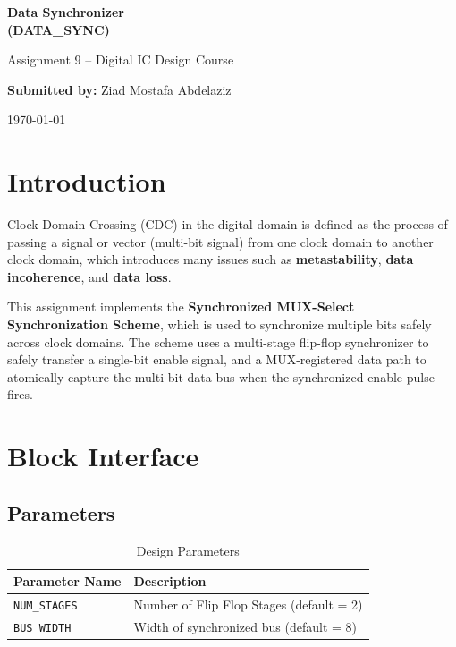 \documentclass[12pt,a4paper]{article}
\begin{document}
\begin{titlepage}
\centering
\vspace*{2cm}
{\Huge\bfseries Data Synchronizer\\(DATA\_SYNC)\par}
\vspace{1cm}
{\Large Assignment 9 -- Digital IC Design Course\par}
\vspace{2cm}
{\large\textbf{Submitted by:} Ziad Mostafa Abdelaziz\par}
\vspace{0.5cm}
{\large\today\par}
\vfill
\end{titlepage}

\tableofcontents
\newpage

\section{Introduction}

Clock Domain Crossing (CDC) in the digital domain is defined as the process of passing a signal or vector (multi-bit signal) from one clock domain to another clock domain, which introduces many issues such as \textbf{metastability}, \textbf{data incoherence}, and \textbf{data loss}.

This assignment implements the \textbf{Synchronized MUX-Select Synchronization Scheme}, which is used to synchronize multiple bits safely across clock domains. The scheme uses a multi-stage flip-flop synchronizer to safely transfer a single-bit enable signal, and a MUX-registered data path to atomically capture the multi-bit data bus when the synchronized enable pulse fires.

\section{Block Interface}

\subsection{Parameters}
\begin{table}[H]
\centering
\begin{tabular}{@{}ll@{}}
\toprule
\textbf{Parameter Name} & \textbf{Description} \\
\midrule
\texttt{NUM\_STAGES} & Number of Flip Flop Stages (default = 2) \\
\texttt{BUS\_WIDTH}  & Width of synchronized bus (default = 8) \\
\bottomrule
\end{tabular}
\caption{Design Parameters}
\end{table}
\end{document}
